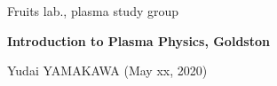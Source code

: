 \documentclass[10pt,dvipdfmx,landscape]{jsarticle}
\begin{document}
%
%
%
\noindent
{\footnotesize
Fruits lab., plasma study group
}

\noindent
	\textbf{\Large
		Introduction to Plasma Physics, Goldston
	}

	\vspace{1ex}

\noindent
	\textrm{\small 
		Yudai YAMAKAWA (May xx, 2020)
	}



\vspace{4ex}


\end{document}
